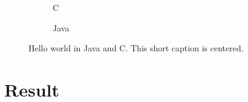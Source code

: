 \begin{figure}
  \centering
  \begin{subfigure}[b]{\textwidth}
      
      \caption{C}
      \label{fig:c:hello}
  \end{subfigure}

  \begin{subfigure}[b]{\textwidth}
      
      \caption{Java}
      \label{fig:java:hello}
  \end{subfigure}

  \caption{Hello world in Java and C. This short caption is centered.}
  \label{fig:helloworld}
\end{figure}
\section{Result}
\label{sec:Result}


